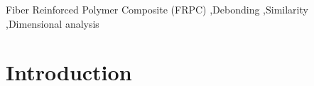 \documentclass[a4paper,fleqn]{cas-dc}
\begin{document}
\begin{abstract}
This template helps you to create a properly formatted \LaTeX\ manuscript.

\noindent\texttt{\textbackslash begin{abstract}} \dots 
\texttt{\textbackslash end{abstract}} and
\verb+\begin{keyword}+ \verb+...+ \verb+\end{keyword}+ 
which
contain the abstract and keywords respectively. 

\noindent Each keyword shall be separated by a \verb+\sep+ command.
\end{abstract}

%

\begin{keywords}
Fiber Reinforced Polymer Composite (FRPC) \sep Debonding \sep Similarity \sep Dimensional analysis
\end{keywords}


\maketitle

\section{Introduction}
\end{document}
